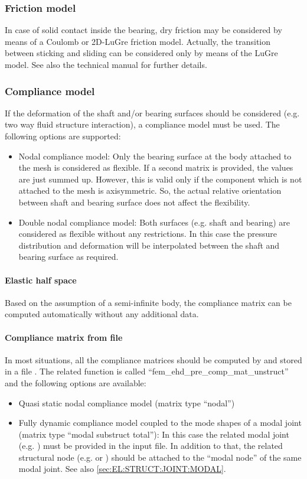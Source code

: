 \subsubsection{Friction model}
In case of solid contact inside the bearing, dry friction may be considered by means of a Coulomb or 2D-LuGre friction model\cite{LuGre2D}. Actually, the transition between sticking and sliding can be considered only by means of the LuGre model. See also the technical manual for further details.
\subsubsection{Compliance model}
If the deformation of the shaft and/or bearing surfaces should be considered (e.g. two way fluid structure interaction), a compliance model must be used. The following options are supported:
\begin{itemize}
\item{Nodal compliance model:} Only the bearing surface at the body attached to the mesh is considered as flexible. If a second matrix is provided, the values are just summed up. However, this is valid only if the component which is not attached to the mesh is axisymmetric. So, the actual relative orientation between shaft and bearing surface does not affect the flexibility.
\item{Double nodal compliance model:} Both surfaces (e.g. shaft and bearing) are considered as flexible without any restrictions. In this case the pressure distribution and deformation will be interpolated between the shaft and bearing surface as required.
\end{itemize}
\paragraph{Elastic half space}
Based on the assumption of a semi-infinite body, the compliance matrix can be computed automatically without any additional data.
\paragraph{Compliance matrix from file}
In most situations, all the compliance matrices should be computed by  and stored in a file . The related function is called ``fem\_ehd\_pre\_comp\_mat\_unstruct'' and the following options are available:
\begin{itemize}
\item{Quasi static nodal compliance model (matrix type ``nodal'')}
\item{Fully dynamic compliance model coupled to the mode shapes of a modal joint (matrix type ``modal substruct total''):} In this case the related modal joint (e.g. ) must be provided in the input file. In addition to that, the related structural node (e.g.  or ) should be attached to the ``modal node'' of the same modal joint. See also \ref{sec:EL:STRUCT:JOINT:MODAL}.
\end{itemize}

